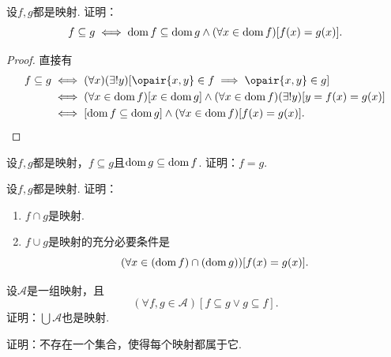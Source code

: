 \begin{example}
设\(f,g\)都是映射.
证明：\begin{equation*}
	f \subseteq g
	\iff
	\operatorname{dom} f \subseteq \operatorname{dom} g
	\land
	(\forall x \in \operatorname{dom} f)
	[f(x) = g(x)].
\end{equation*}
\begin{proof}
直接有
\begin{align*}
	f \subseteq g
	&\iff (\forall x)(\exists!y)[\opair{x,y} \in f \implies \opair{x,y} \in g] \\
	&\iff (\forall x \in \dom f)[x \in \dom g]\land(\forall x \in \dom f)(\exists!y)[y=f(x)=g(x)] \\
	&\iff [\dom f \subseteq \dom g]\land(\forall x \in \dom f)[f(x)=g(x)].
	\qedhere
\end{align*}
\end{proof}
\end{example}

\begin{example}
设\(f,g\)都是映射，\(f \subseteq g\)且\(\operatorname{dom} g \subseteq \operatorname{dom} f\).
证明：\(f=g\).
\end{example}

\begin{example}
设\(f,g\)都是映射.
证明：
\begin{enumerate}
	\item \(f \cap g\)是映射.
	\item \(f \cup g\)是映射的充分必要条件是\begin{equation*}
		(\forall x \in (\operatorname{dom} f)\cap(\operatorname{dom} g))[f(x)=g(x)].
	\end{equation*}
\end{enumerate}
\end{example}

\begin{example}
\def\A{\mathscr{A}}%
设\(\A\)是一组映射，且\begin{equation*}
	(\forall f,g\in\A)[f \subseteq g \lor g \subseteq f].
\end{equation*}
证明：\(\bigcup\A\)也是映射.
\end{example}

\begin{example}
证明：不存在一个集合，使得每个映射都属于它.
\end{example}

